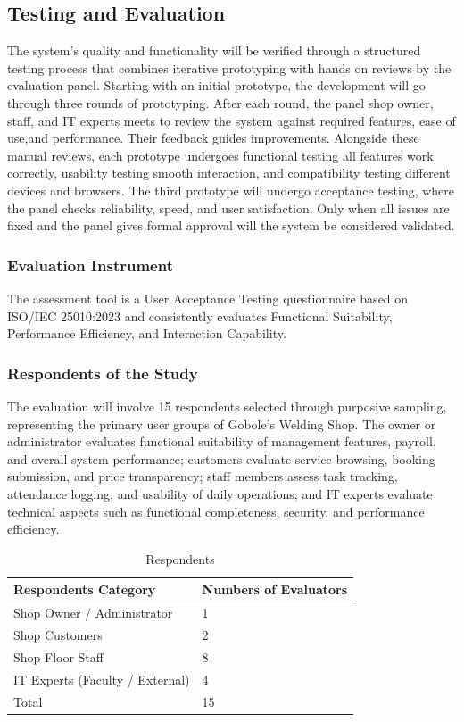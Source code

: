 \documentclass[12pt, letterpaper]{article}
\begin{document}
\subsection{Testing and Evaluation}
\hspace*{2em} The system’s quality and functionality will be verified through a structured testing process that combines iterative prototyping with hands on reviews by the evaluation panel. Starting with an initial prototype, the development will go through three rounds of prototyping. After each round, the panel shop owner, staff, and IT experts meets to review the system against required features, ease of use,and performance.
\hspace*{2em} Their feedback guides improvements. Alongside these manual reviews, each prototype undergoes functional testing all features work correctly, usability testing smooth interaction, and compatibility testing different devices and browsers. The third prototype will undergo acceptance testing, where the panel checks reliability, speed, and user satisfaction. Only when all issues are fixed and the panel gives formal approval will the system be considered validated.

\subsubsection{Evaluation Instrument}
\hspace*{2em} The assessment tool is a User Acceptance Testing questionnaire based on ISO/IEC 25010:2023 and consistently evaluates Functional Suitability, Performance Efficiency, and Interaction Capability.

\subsubsection{Respondents of the Study}
\hspace*{2em} The evaluation will involve 15 respondents selected through purposive sampling, representing the primary user groups of Gobole's Welding Shop. The owner or administrator evaluates functional suitability of management features, payroll, and overall system performance; customers evaluate service browsing, booking submission, and price transparency; staff members assess task tracking, attendance logging, and usability of daily operations; and IT experts evaluate technical aspects such as functional completeness, security, and performance efficiency.

\begin{table}[h]
\centering
\caption{Respondents}
\begin{tabular}{p{6cm} p{6cm}}
\toprule
\textbf{Respondents Category} & \textbf{Numbers of Evaluators} \\
\midrule
Shop Owner / Administrator & 1 \\
Shop Customers & 2 \\
Shop Floor Staff  & 8\\
IT Experts (Faculty / External) &  4\\
Total & 15 \\
\bottomrule
\end{tabular}
\end{table}
\end{document}

